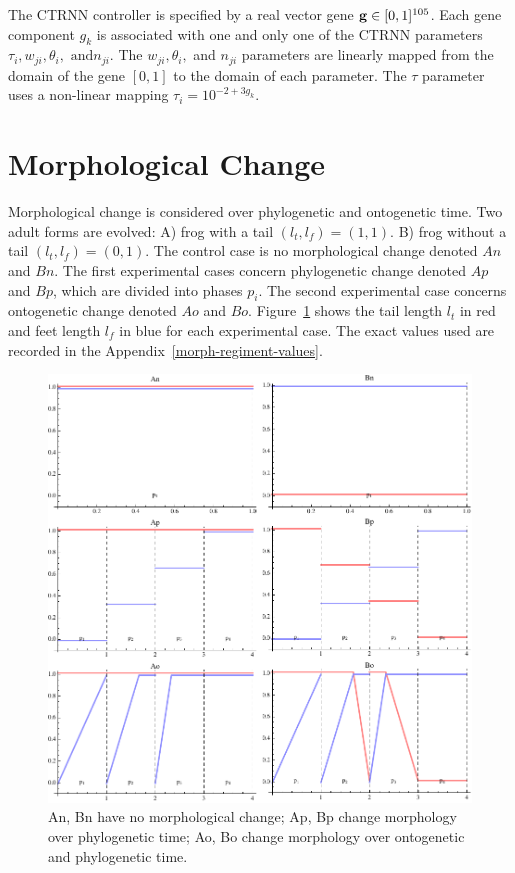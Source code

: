 The CTRNN controller is specified by a real vector gene $\mathbf{g} \in [0,
  1]^{105}$.  Each gene component $g_k$ is associated with one and
only one of the CTRNN parameters $\tau_i, w_{ji}, \theta_i, \text{ and
} n_{ji}$.  The $w_{ji}, \theta_i,$ and $ n_{ji}$ parameters are
linearly mapped from the domain of the gene $[0,1]$ to the domain of
each parameter.  The $\tau$ parameter uses a non-linear mapping
$\tau_i = 10^{-2 + 3 g_k}$.

\section{Morphological Change}\label{morph-change}

Morphological change is considered over phylogenetic and ontogenetic
time.  Two adult forms are evolved: A) frog with a tail $({l_t},
{l_f}) = (1,1).$ B) frog without a tail $({l_t}, {l_f}) =
(0,1).$ The control case is no morphological change denoted $An$ and
$Bn$.  The first experimental cases concern phylogenetic change
denoted $Ap$ and $Bp$, which are divided into phases $p_i$.  The
second experimental case concerns ontogenetic change denoted $Ao$ and
$Bo$.  Figure~\ref{morph-regiment} shows the tail length ${l_t}$ in
red and feet length ${l_f}$ in blue for each experimental case.
The exact values used are recorded in the
Appendix~\ref{morph-regiment-values}.

\begin{figure}
  \centering
  \includegraphics[scale=1.0]{fig/morph-regiment.pdf} 
  \vspace{-15pt}
  \caption[Variations of morphological
    change]{\label{morph-regiment}An, Bn have no morphological change;
    Ap, Bp change morphology over phylogenetic time; Ao, Bo change
    morphology over ontogenetic and phylogenetic time.}

\end{figure}

